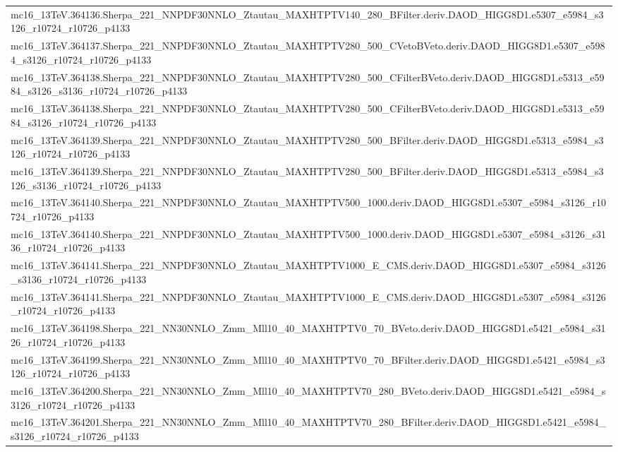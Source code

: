 \begin{adjustwidth}{-3em}{-3em}
\begin{longtable}{l}
mc16\_13TeV.364136.Sherpa\_221\_NNPDF30NNLO\_Ztautau\_MAXHTPTV140\_280\_BFilter.deriv.DAOD\_HIGG8D1.e5307\_e5984\_s3126\_r10724\_r10726\_p4133 \\
mc16\_13TeV.364137.Sherpa\_221\_NNPDF30NNLO\_Ztautau\_MAXHTPTV280\_500\_CVetoBVeto.deriv.DAOD\_HIGG8D1.e5307\_e5984\_s3126\_r10724\_r10726\_p4133 \\
mc16\_13TeV.364138.Sherpa\_221\_NNPDF30NNLO\_Ztautau\_MAXHTPTV280\_500\_CFilterBVeto.deriv.DAOD\_HIGG8D1.e5313\_e5984\_s3126\_s3136\_r10724\_r10726\_p4133 \\
mc16\_13TeV.364138.Sherpa\_221\_NNPDF30NNLO\_Ztautau\_MAXHTPTV280\_500\_CFilterBVeto.deriv.DAOD\_HIGG8D1.e5313\_e5984\_s3126\_r10724\_r10726\_p4133 \\
mc16\_13TeV.364139.Sherpa\_221\_NNPDF30NNLO\_Ztautau\_MAXHTPTV280\_500\_BFilter.deriv.DAOD\_HIGG8D1.e5313\_e5984\_s3126\_r10724\_r10726\_p4133 \\
mc16\_13TeV.364139.Sherpa\_221\_NNPDF30NNLO\_Ztautau\_MAXHTPTV280\_500\_BFilter.deriv.DAOD\_HIGG8D1.e5313\_e5984\_s3126\_s3136\_r10724\_r10726\_p4133 \\
mc16\_13TeV.364140.Sherpa\_221\_NNPDF30NNLO\_Ztautau\_MAXHTPTV500\_1000.deriv.DAOD\_HIGG8D1.e5307\_e5984\_s3126\_r10724\_r10726\_p4133 \\
mc16\_13TeV.364140.Sherpa\_221\_NNPDF30NNLO\_Ztautau\_MAXHTPTV500\_1000.deriv.DAOD\_HIGG8D1.e5307\_e5984\_s3126\_s3136\_r10724\_r10726\_p4133 \\
mc16\_13TeV.364141.Sherpa\_221\_NNPDF30NNLO\_Ztautau\_MAXHTPTV1000\_E\_CMS.deriv.DAOD\_HIGG8D1.e5307\_e5984\_s3126\_s3136\_r10724\_r10726\_p4133 \\
mc16\_13TeV.364141.Sherpa\_221\_NNPDF30NNLO\_Ztautau\_MAXHTPTV1000\_E\_CMS.deriv.DAOD\_HIGG8D1.e5307\_e5984\_s3126\_r10724\_r10726\_p4133 \\
mc16\_13TeV.364198.Sherpa\_221\_NN30NNLO\_Zmm\_Mll10\_40\_MAXHTPTV0\_70\_BVeto.deriv.DAOD\_HIGG8D1.e5421\_e5984\_s3126\_r10724\_r10726\_p4133 \\
mc16\_13TeV.364199.Sherpa\_221\_NN30NNLO\_Zmm\_Mll10\_40\_MAXHTPTV0\_70\_BFilter.deriv.DAOD\_HIGG8D1.e5421\_e5984\_s3126\_r10724\_r10726\_p4133 \\
mc16\_13TeV.364200.Sherpa\_221\_NN30NNLO\_Zmm\_Mll10\_40\_MAXHTPTV70\_280\_BVeto.deriv.DAOD\_HIGG8D1.e5421\_e5984\_s3126\_r10724\_r10726\_p4133 \\
mc16\_13TeV.364201.Sherpa\_221\_NN30NNLO\_Zmm\_Mll10\_40\_MAXHTPTV70\_280\_BFilter.deriv.DAOD\_HIGG8D1.e5421\_e5984\_s3126\_r10724\_r10726\_p4133 \\

\end{longtable}
\end{adjustwidth}
